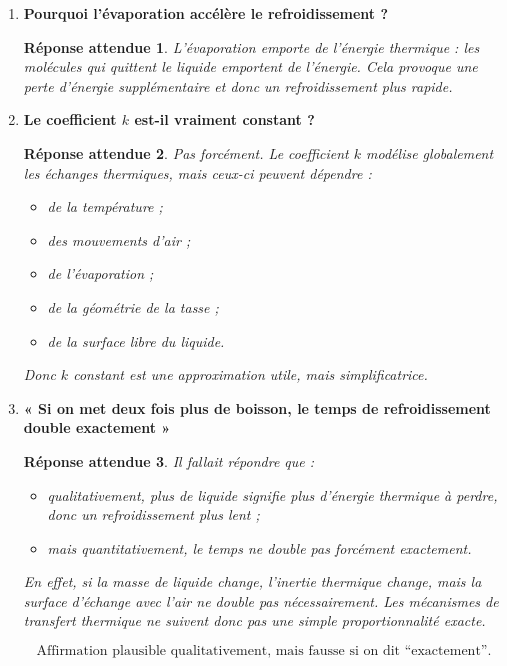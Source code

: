\documentclass[11pt,a4paper]{article}
\newtheorem*{reponseattendue}{Réponse attendue}
\begin{document}
\begin{enumerate}[label=\textbf{2.\arabic*}, resume, leftmargin=1.6em]

\item \textbf{Pourquoi l’évaporation accélère le refroidissement ?}

\begin{reponseattendue}
L’évaporation emporte de l’énergie thermique : les molécules qui quittent le liquide emportent de l’énergie.  
Cela provoque une perte d’énergie supplémentaire et donc un refroidissement plus rapide.
\end{reponseattendue}

\item \textbf{Le coefficient \(k\) est-il vraiment constant ?}

\begin{reponseattendue}
Pas forcément. Le coefficient \(k\) modélise globalement les échanges thermiques, mais ceux-ci peuvent dépendre :
\begin{itemize}
    \item de la température ;
    \item des mouvements d’air ;
    \item de l’évaporation ;
    \item de la géométrie de la tasse ;
    \item de la surface libre du liquide.
\end{itemize}
Donc \(k\) constant est une approximation utile, mais simplificatrice.
\end{reponseattendue}

\item \textbf{« Si on met deux fois plus de boisson, le temps de refroidissement double exactement »}

\begin{reponseattendue}
Il fallait répondre que :
\begin{itemize}
    \item qualitativement, plus de liquide signifie plus d’énergie thermique à perdre, donc un refroidissement plus lent ;
    \item mais quantitativement, le temps ne double pas forcément exactement.
\end{itemize}

En effet, si la masse de liquide change, l’inertie thermique change, mais la surface d’échange avec l’air ne double pas nécessairement. Les mécanismes de transfert thermique ne suivent donc pas une simple proportionnalité exacte.
\end{reponseattendue}

\[
\boxed{\text{Affirmation plausible qualitativement, mais fausse si on dit “exactement”.}}
\]

\end{enumerate}
\end{document}
